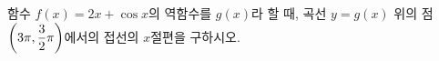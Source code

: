 함수 $f(x)=2x+\cos x$의 역함수를 $g(x)$라 할 때, 곡선 $y=g(x)$ 위의 점 $\left(3\pi{,}\mkern3mu\mathopen{}\dfrac{3}{2}\pi\right)$에서의 접선의 $x$절편을 구하시오.
